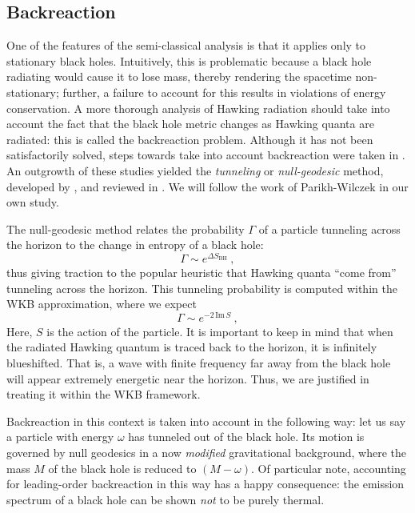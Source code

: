 \documentclass[a4paper,11pt]{article}
\newcommand{\im}{\text{Im} \,}
\begin{document}
\subsection*{Backreaction}
One of the features of the semi-classical analysis \cite{Hawking:1974sw} is that it applies only to stationary black holes. Intuitively, this is problematic because a black hole radiating would cause it to lose mass, thereby rendering the spacetime non-stationary; further, a failure to account for this results in violations of energy conservation. A more thorough analysis of Hawking radiation should take into account the fact that the black hole metric changes as Hawking quanta are radiated: this is called the backreaction problem. Although it has not been satisfactorily solved, steps towards take into account backreaction were taken in \cite{Kraus:1994by,Kraus:1994fj}. An outgrowth of these studies yielded the \emph{tunneling} or \emph{null-geodesic} method, developed by \cite{Srinivasan:1998ty,Parikh:1999mf,Shankaranarayanan:2000gb,Padmanabhan:2004tz}, and reviewed in \cite{Vanzo:2011wq}. We will follow the work of Parikh-Wilczek \cite{Parikh:1999mf} in our own study. 

The null-geodesic method relates the probability $\Gamma$ of a particle tunneling across the horizon to the change in entropy of a black hole:
\begin{equation}
\Gamma \sim e^{\Delta S_{\text{BH}}} \ ,
\end{equation}
thus giving traction to the popular heuristic that Hawking quanta ``come from'' tunneling across the horizon. This tunneling probability is computed within the WKB approximation, where we expect
\begin{equation}
\Gamma \sim e^{-2 \, \im S} \ ,
\end{equation}
Here, $S$ is the action of the particle. It is important to keep in mind that when the radiated Hawking quantum is traced back to the horizon, it is infinitely blueshifted. That is, a wave with finite frequency far away from the black hole will appear extremely energetic near the horizon. Thus, we are justified in treating it within the WKB framework. 

Backreaction in this context is taken into account in the following way: let us say a particle with energy $\omega$ has tunneled out of the black hole. Its motion is governed by null geodesics in a now \emph{modified} gravitational background, where the mass $M$ of the black hole is reduced to $(M - \omega)$. Of particular note, accounting for leading-order backreaction in this way has a happy consequence: the emission spectrum of a black hole can be shown \emph{not} to be purely thermal.
\end{document}
